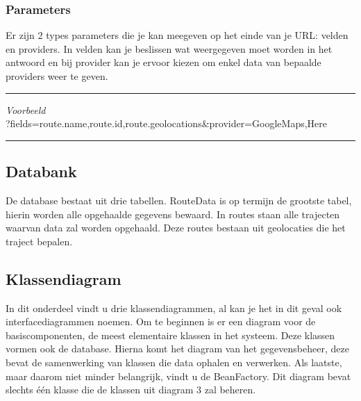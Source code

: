 \documentclass[ps,a4paper,oneside]{report}
\begin{document}
\subsubsection{Parameters}
Er zijn 2 types parameters die je kan meegeven op het einde van je URL: velden en providers. In velden kan je beslissen wat weergegeven moet worden in het antwoord en bij provider kan je ervoor kiezen om enkel data van bepaalde providers weer te geven.\\
\noindent\rule[0.5ex]{\linewidth}{1pt}
\textit{Voorbeeld}\\
?fields=route.name,route.id,route.geolocations\&provider=GoogleMaps,Here\\
\noindent\rule[0.5ex]{\linewidth}{1pt}
\subsection{Databank}
De database bestaat uit drie tabellen. RouteData is op termijn de grootste tabel, hierin worden alle opgehaalde gegevens bewaard. In routes staan alle trajecten waarvan data zal worden opgehaald. Deze routes bestaan uit geolocaties die het traject bepalen.
\subsection{Klassendiagram}
In dit onderdeel vindt u drie klassendiagrammen, al kan je het in dit geval ook interfacediagrammen noemen. Om te beginnen is er een diagram voor de basiscomponenten, de meest elementaire klassen in het systeem. Deze klassen vormen ook de database. Hierna komt het diagram van het gegevensbeheer, deze bevat de samenwerking van klassen die data ophalen en verwerken. Als laatste, maar daarom niet minder belangrijk, vindt u de BeanFactory. Dit diagram bevat slechts \'e\'en klasse die de klassen uit diagram 3 zal beheren.
\end{document}
